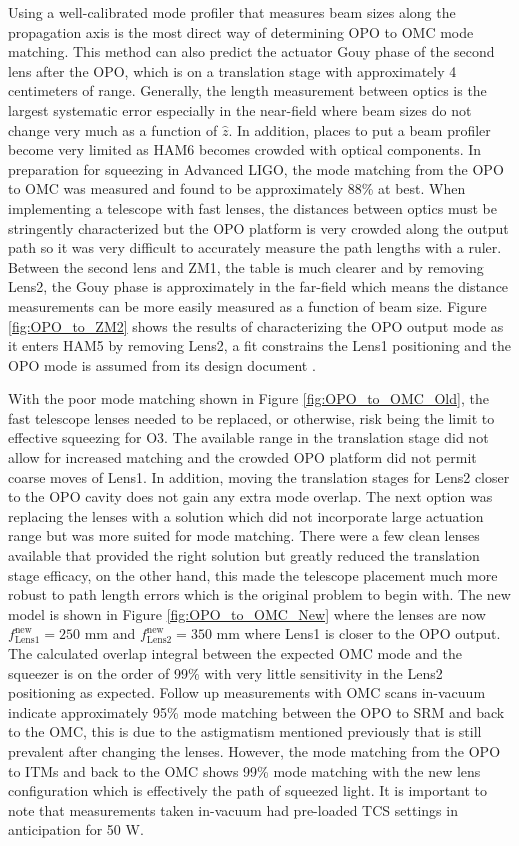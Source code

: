 	Using a well-calibrated mode profiler that measures beam sizes along the propagation axis is the most direct way of determining OPO to OMC mode matching.  This method can also predict the actuator Gouy phase of the second lens after the OPO, which is on a translation stage with approximately 4 centimeters of range. Generally, the length measurement between optics is the largest systematic error especially in the near-field where beam sizes do not change very much as a function of $\hat{z}$.  In addition, places to put a beam profiler become very limited as HAM6 becomes crowded with optical components.  In preparation for squeezing in Advanced LIGO, the mode matching from the OPO to OMC was measured and found to be approximately 88\% at best. When implementing a telescope with fast lenses, the distances between optics must be stringently characterized but the OPO platform is very crowded along the output path so it was very difficult to accurately measure the path lengths with a ruler.  Between the second lens and ZM1, the table is much clearer and by removing Lens2, the Gouy phase is approximately in the far-field which means the distance measurements can be more easily measured as a function of beam size.  Figure \ref{fig:OPO_to_ZM2} shows the results of characterizing the OPO output mode as it enters HAM5 by removing Lens2, a fit constrains the Lens1 positioning and the OPO mode is assumed from its design document \cite{Oelker_FD_sqz}.
	
	With the poor mode matching shown in Figure \ref{fig:OPO_to_OMC_Old}, the fast telescope lenses needed to be replaced, or otherwise, risk being the limit to effective squeezing for O3.  The available range in the translation stage did not allow for increased matching and the crowded OPO platform did not permit coarse moves of Lens1. In addition, moving the translation stages for Lens2 closer to the OPO cavity does not gain any extra mode overlap.  The next option was replacing the lenses with a solution which did not incorporate large actuation range but was more suited for mode matching.  There were a few clean lenses available that provided the right solution but greatly reduced the translation stage efficacy, on the other hand, this made the telescope placement much more robust to path length errors which is the original problem to begin with.  The new model is shown in Figure \ref{fig:OPO_to_OMC_New} where the lenses are now  $f^{\text{new}}_{\text{Lens1}} = 250$ mm and $f^{\text{new}}_{\text{Lens2}} = 350$ mm where Lens1 is closer to the OPO output.   The calculated overlap integral between the expected OMC mode and the squeezer is on the order of 99\% with very little sensitivity in the Lens2 positioning as expected.  Follow up measurements with OMC scans in-vacuum indicate approximately 95\% mode matching between the OPO to SRM and back to the OMC, this is due to the astigmatism mentioned previously that is still prevalent after changing the lenses.  However, the mode matching from the OPO to ITMs and back to the OMC shows 99\% mode matching with the new lens configuration \cite{modematch99} which is effectively the path of squeezed light.  It is important to note that measurements taken in-vacuum had pre-loaded TCS settings in anticipation for 50 W.
	
